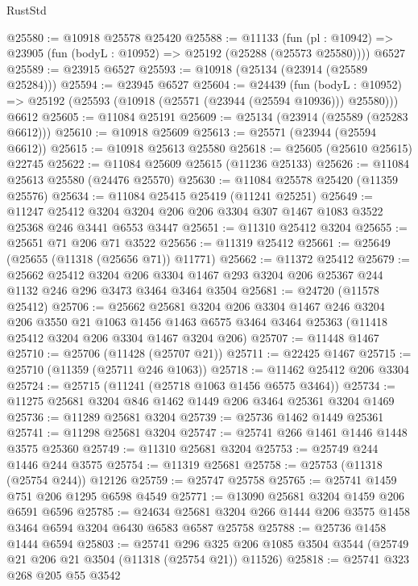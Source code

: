 \begin{lexlean}{RustStd}
\begin{coremodule}
{{{{{{{{{{{{{{{{{{{@25580 := @10918 @25578 @25420
@25588 := @11133
    (fun (pl : @10942) => @23905 (fun (bodyL : @10952) => @25192 (@25288 (@25573 @25580))))
    @6527
@25589 := @23915 @6527
@25593 := @10918 (@25134 (@23914 (@25589 @25284)))
@25594 := @23945 @6527
@25604 := @24439
    (fun (bodyL : @10952) => @25192 (@25593 (@10918 (@25571 (@23944 (@25594 @10936))) @25580)))
    @6612
@25605 := @11084 @25191
@25609 := @25134 (@23914 (@25589 (@25283 @6612)))
@25610 := @10918 @25609
@25613 := @25571 (@23944 (@25594 @6612))
@25615 := @10918 @25613 @25580
@25618 := @25605 (@25610 @25615) @22745
@25622 := @11084 @25609 @25615 (@11236 @25133)
@25626 := @11084 @25613 @25580 (@24476 @25570)
@25630 := @11084 @25578 @25420 (@11359 @25576)
@25634 := @11084 @25415 @25419 (@11241 @25251)
@25649 := @11247
    @25412
    @3204
    @3204
    @206
    @206
    @3304
    @307
    @1467
    @1083
    @3522
    @25368
    @246
    @3441
    @6553
    @3447
@25651 := @11310 @25412 @3204
@25655 := @25651 @71 @206 @71 @3522
@25656 := @11319 @25412
@25661 := @25649 (@25655 (@11318 (@25656 @71)) @11771)
@25662 := @11372 @25412
@25679 := @25662
    @25412
    @3204
    @206
    @3304
    @1467
    @293
    @3204
    @206
    @25367
    @244
    @1132
    @246
    @296
    @3473
    @3464
    @3464
    @3504
@25681 := @24720 (@11578 @25412)
@25706 := @25662
    @25681
    @3204
    @206
    @3304
    @1467
    @246
    @3204
    @206
    @3550
    @21
    @1063
    @1456
    @1463
    @6575
    @3464
    @3464
    @25363
    (@11418 @25412 @3204 @206 @3304 @1467 @3204 @206)
@25707 := @11448 @1467
@25710 := @25706 (@11428 (@25707 @21))
@25711 := @22425 @1467
@25715 := @25710 (@11359 (@25711 @246 @1063))
@25718 := @11462 @25412 @206 @3304
@25724 := @25715 (@11241 (@25718 @1063 @1456 @6575 @3464))
@25734 := @11275 @25681 @3204 @846 @1462 @1449 @206 @3464 @25361 @3204 @1469
@25736 := @11289 @25681 @3204
@25739 := @25736 @1462 @1449 @25361
@25741 := @11298 @25681 @3204
@25747 := @25741 @266 @1461 @1446 @1448 @3575 @25360
@25749 := @11310 @25681 @3204
@25753 := @25749 @244 @1446 @244 @3575
@25754 := @11319 @25681
@25758 := @25753 (@11318 (@25754 @244)) @12126
@25759 := @25747 @25758
@25765 := @25741 @1459 @751 @206 @1295 @6598 @4549
@25771 := @13090 @25681 @3204 @1459 @206 @6591 @6596
@25785 := @24634 @25681 @3204 @266 @1444 @206 @3575 @1458 @3464 @6594 @3204 @6430 @6583 @6587 @25758
@25788 := @25736 @1458 @1444 @6594
@25803 := @25741
    @296
    @325
    @206
    @1085
    @3504
    @3544
    (@25749 @21 @206 @21 @3504 (@11318 (@25754 @21)) @11526)
@25818 := @25741
    @323
    @268
    @205
    @55
    @3542
}}}}}}}}}}}}}}}}}}}
\end{coremodule}
\end{lexlean}
